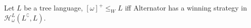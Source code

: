 \begin{proposition}\label{prop:omega} Let $L$ be a tree language, $[\omega]^+ \leq_W L$ iff Alternator has a winning strategy in $\mathcal{H}^{L}_\omega(L^\complement, L)$. 

\end{proposition}
%
%
%
